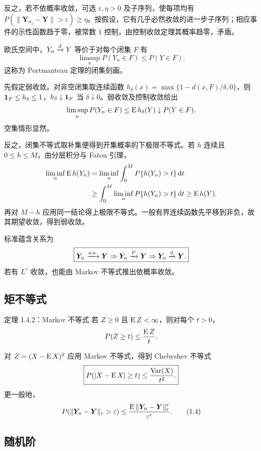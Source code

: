 反之，若不依概率收敛，可选 $\varepsilon,\eta>0$ 及子序列，使每项均有
$P(\|\bm Y_{n_j}-\bm Y\|>\varepsilon)\ge\eta$。按假设，它有几乎必然收敛的进一步子序列；相应事件的示性函数趋于零，被常数 $1$ 控制，由控制收敛定理其概率趋零，矛盾。

\begin{notebox}[弱收敛的闭集判别及证明]
欧氏空间中，$Y_n\xrightarrow{d} Y$ 等价于对每个闭集 $F$ 有
\[
 \limsup_nP(Y_n\in F)\le P(Y\in F).
\]
这称为 Portmanteau 定理的闭集刻画。

先假定弱收敛。对非空闭集取连续函数
$h_\delta(x)=\max\{1-d(x,F)/\delta,0\}$，则 $\mathbf 1_F\le h_\delta\le1$，$h_\delta\downarrow\mathbf 1_F$ 当 $\delta\downarrow0$。弱收敛及控制收敛给出
\[
 \limsup_nP(Y_n\in F)\le\operatorname{E} h_\delta(Y)\downarrow P(Y\in F).
\]
空集情形显然。

反之，闭集不等式取补集便得到开集概率的下极限不等式。若 $h$ 连续且 $0\le h\le M$，由分层积分与 Fatou 引理，
\[
 \begin{aligned}
 \liminf_n\operatorname{E} h(Y_n)
 &=\liminf_n\int_0^M P\{h(Y_n)>t\}\,\mathrm dt\\
 &\ge\int_0^M\liminf_nP\{h(Y_n)>t\}\,\mathrm dt
 \ge\operatorname{E} h(Y).
 \end{aligned}
\]
再对 $M-h$ 应用同一结论得上极限不等式。一般有界连续函数先平移到非负，故其期望收敛，得到弱收敛。
\end{notebox}


标准蕴含关系为
\[
 \boxed{
 \bm Y_n\xrightarrow{\mathrm{a.s.}}\bm Y
 \Rightarrow
 \bm Y_n\xrightarrow{P}\bm Y
 \Rightarrow
 \bm Y_n\xrightarrow{d}\bm Y.}
\]
若有 $L^r$ 收敛，也能由 Markov 不等式推出依概率收敛。

\subsection{矩不等式}

\begin{definitionbox}{定理 1.4.2：Markov 不等式}
若 $Z\geq0$ 且 $\operatorname{E} Z<\infty$，则对每个 $t>0$，
\[
 P(Z\geq t)\leq\frac{\operatorname{E} Z}{t}.
\]
\end{definitionbox}

对 $Z=(X-\operatorname{E} X)^2$ 应用 Markov 不等式，得到 Chebyshev 不等式
\[
 \boxed{
 P(|X-\operatorname{E} X|\geq t)
 \leq\frac{\operatorname{Var}(X)}{t^2}.}
\]
更一般地，
\[
 P(\|\bm Y_n-\bm Y\|_r>\varepsilon)
 \leq
 \frac{\operatorname{E}\|\bm Y_n-\bm Y\|_r^r}{\varepsilon^r}.
 \tag{1.4}
\]

\subsection{随机阶}

